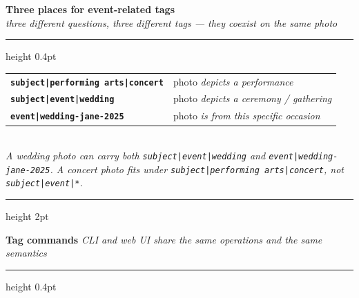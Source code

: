 \documentclass[a3paper,landscape,10pt]{article}
\newcommand{\cmd}[1]{\texttt{\small #1}}
\newcommand{\secthead}[2]{%
  \textcolor{maki-salmon}{\bfseries\normalsize #1}\hspace{1em}%
  \textcolor{maki-stone}{\footnotesize\itshape #2}\\[2pt]%
  {\color{maki-salmon!40}\hrule height 0.4pt}\vspace{6pt}%
}
\newcommand{\sectheadbreak}[2]{%
  \textcolor{maki-salmon}{\bfseries\normalsize #1}\\%
  \textcolor{maki-stone}{\footnotesize\itshape #2}\\[2pt]%
  {\color{maki-salmon!40}\hrule height 0.4pt}\vspace{6pt}%
}
\begin{document}
\begin{minipage}[t]{0.335\textwidth}
  \sectheadbreak{Three places for event-related tags}{three different questions, three different tags — they coexist on the same photo}

  \scriptsize
  \renewcommand{\arraystretch}{1.35}
  \begin{tabular}{@{}>{\raggedright\arraybackslash}p{} >{\raggedright\arraybackslash}p{}@{}}
    \textcolor{fc-subject}{\bfseries\cmd{subject|performing arts|concert}} &
      photo \emph{depicts a performance} \\
    \textcolor{fc-subject}{\bfseries\cmd{subject|event|wedding}} &
      photo \emph{depicts a ceremony / gathering} \\
    \textcolor{fc-event}{\bfseries\cmd{event|wedding-jane-2025}} &
      photo \emph{is from this specific occasion} \\
  \end{tabular}\\[4pt]
  {\scriptsize\color{maki-stone}\itshape A wedding photo can carry both \cmd{subject|event|wedding} and \cmd{event|wedding-jane-2025}. A concert photo fits under \cmd{subject|performing arts|concert}, not \cmd{subject|event|*}.}
\end{minipage}

\vspace{14pt}
{\color{maki-cream}\hrule height 2pt}
\vspace{10pt}

\secthead{Tag commands}{CLI and web UI share the same operations and the same semantics}
\end{document}

